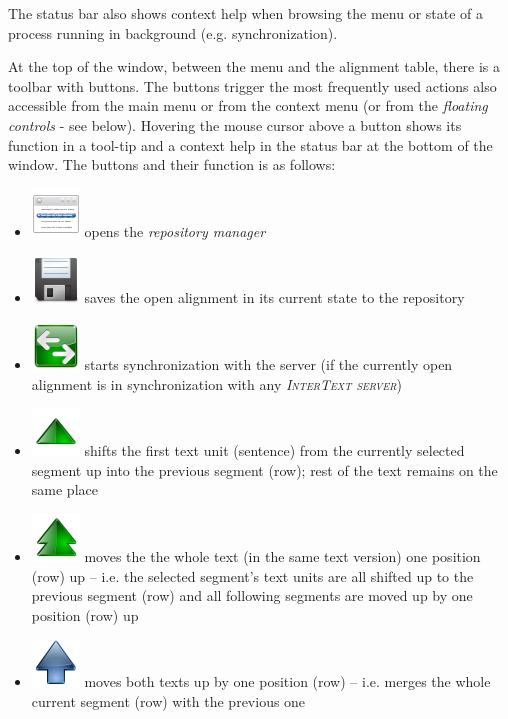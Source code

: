 \documentclass[a4paper,10pt,oneside]{book}
\newcommand{\ITserver}{\textit{\textsc{InterText server}}\xspace}
\begin{document}
The status bar also shows context help when browsing the menu or state of a process running in background (e.g. synchronization).

At the top of the window, between the menu and the alignment table, there is a toolbar with buttons. The buttons trigger the most frequently used actions also accessible from the main menu or from the context menu (or from the \emph{floating controls} - see below). Hovering the mouse cursor above a button shows its function in a tool-tip and a context help in the status bar at the bottom of the window. The buttons and their function is as follows:

\begin{itemize}
	\item \includegraphics[height=2ex]{../images/48/manager.png} opens the \emph{repository manager}
	\item \includegraphics[height=2ex]{../images/48/document-save.png} saves the open alignment in its current state to the repository
	\item \includegraphics[height=2ex]{../images/48/synchronize.png} starts synchronization with the server (if the currently open alignment is in synchronization with any \ITserver)
	\item \includegraphics[height=2ex]{../images/48/arrow-up.png} shifts the first text unit (sentence) from the currently selected segment up into the previous segment (row); rest of the text remains on the same place
	\item \includegraphics[height=2ex]{../images/48/arrow-up-double.png} moves the the whole text (in the same text version) one position (row) up -- i.e. the selected segment's text units are all shifted up to the previous segment (row) and all following segments are moved up by one position (row) up
	\item \includegraphics[height=2ex]{../images/48/go-up.png} moves both texts up by one position (row) -- i.e. merges the whole current segment (row) with the previous one

\end{itemize}
\end{document}
